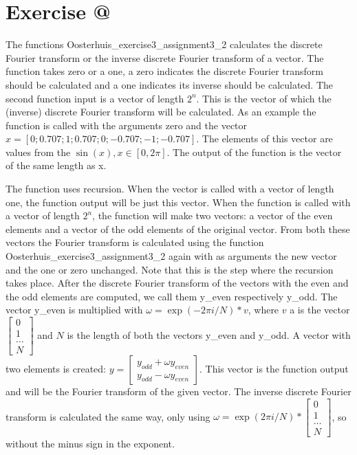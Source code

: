 \documentclass[12pt]{article}
\makeatletter
\newcommand*{\rom}[1]{\expandafter\@slowromancap\romannumeral #1@}
\newcommand{\N}{\mathbb{N}}
\makeatother
\begin{document}
\section*{Exercise \rom{3}}

The functions Oosterhuis\_exercise3\_assignment3\_2 calculates the discrete Fourier transform or the inverse discrete Fourier transform of a vector. The function takes zero or a one, a zero indicates the discrete Fourier transform should be calculated and  a one indicates its inverse should be calculated. The second function input is a vector of length $2^n$. This is the vector of which the (inverse) discrete Fourier transform will be calculated. As an example the function is called with the arguments zero and the vector $x = [0;0.707;1;0.707;0;-0.707;-1;-0.707]$. The elements of this vector are values from the $\sin(x), x\in[0,2\pi]$. The output of the function is the vector of the same length as x.

The function uses recursion. When the vector is called with a vector of length one, the function output will be just this vector. When the function is called with a vector of length $2^n$, the function will make two vectors: a vector of the even elements and a vector of the odd elements of the original vector. From both these vectors the Fourier transform is calculated using the function Oosterhuis\_exercise3\_assignment3\_2 again with as arguments the new vector and the one or zero unchanged. Note that this is the step where the recursion takes place. After the discrete Fourier transform of the vectors with the even and the odd elements are computed, we call them y\_even respectively y\_odd. The vector y\_even is multiplied with $\omega = \exp(-2 \pi i / N) * v $, where $v$ a is the vector $\begin{bmatrix} 0 \\ 1 \\ \dots \\ N \end{bmatrix} $ and $N$ is the length of both the vectors y\_even and y\_odd. A vector with two elements is created: $y = \begin{bmatrix} y_{odd} + \omega y_{even} \\ y_{odd} - \omega y_{even} \end{bmatrix}$. This vector is the function output and will be the Fourier transform of the given vector.
The inverse discrete Fourier transform is calculated the same way, only using $\omega = \exp{(2\pi i / N)} * \begin{bmatrix} 0 \\ 1 \\ \dots \\N \end{bmatrix}$, so without the minus sign in the exponent. %
\end{document}
